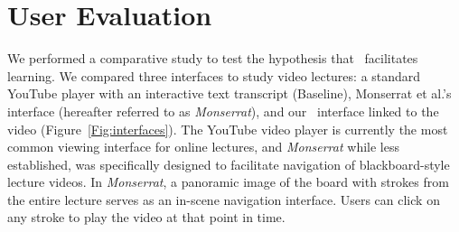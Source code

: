 \section{User Evaluation}
We performed a comparative study to test the hypothesis that \systemname\ facilitates learning. We compared three interfaces to study video lectures: a standard YouTube player with an interactive text transcript (Baseline), Monserrat et al.'s interface \cite{monserrat2013notevideo} (hereafter referred to as \emph{Monserrat}), and our \systemname\ interface linked to the video (Figure~\ref{Fig:interfaces}). The YouTube video player is currently the most common viewing interface for online lectures, and \textit{Monserrat} while less established, was specifically designed to facilitate navigation of blackboard-style lecture videos. In \emph{Monserrat}, a panoramic image of the board with strokes from the entire lecture serves as an in-scene navigation interface. Users can click on any stroke to play the video at that point in time.
%
